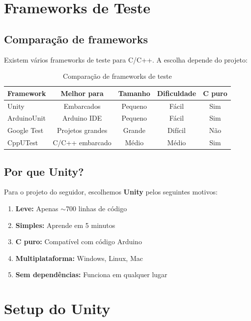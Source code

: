 \documentclass[12pt,a4paper]{article}
\begin{document}
\section{Frameworks de Teste}

\subsection{Comparação de frameworks}

Existem vários frameworks de teste para C/C++. A escolha depende do projeto:

\begin{table}[H]
\centering
\begin{tabular}{|l|c|c|c|c|}
\toprule
\textbf{Framework} & \textbf{Melhor para} & \textbf{Tamanho} & \textbf{Dificuldade} & \textbf{C puro} \\
\midrule
Unity & Embarcados & Pequeno & Fácil & Sim \\
ArduinoUnit & Arduino IDE & Pequeno & Fácil & Sim \\
Google Test & Projetos grandes & Grande & Difícil & Não \\
CppUTest & C/C++ embarcado & Médio & Médio & Sim \\
\bottomrule
\end{tabular}
\caption{Comparação de frameworks de teste}
\end{table}

\subsection{Por que Unity?}

Para o projeto do seguidor, escolhemos \textbf{Unity} pelos seguintes motivos:

\begin{enumerate}
    \item \textbf{Leve:} Apenas $\sim$700 linhas de código
    \item \textbf{Simples:} Aprende em 5 minutos
    \item \textbf{C puro:} Compatível com código Arduino
    \item \textbf{Multiplataforma:} Windows, Linux, Mac
    \item \textbf{Sem dependências:} Funciona em qualquer lugar
\end{enumerate}

\section{Setup do Unity}
\end{document}
